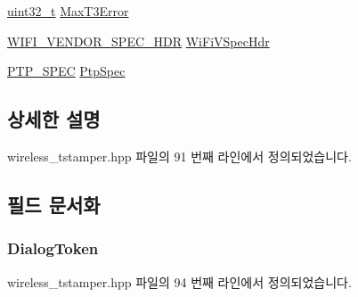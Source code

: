 \begin{DoxyCompactItemize}
\item 
\hyperlink{parse_8c_a6eb1e68cc391dd753bc8ce896dbb8315}{uint32\+\_\+t} \hyperlink{struct___t_i_m_i_n_g_m_s_m_t___e_v_e_n_t___d_a_t_a_aff7bc9f4cc3066fb2a16f752106f15a7}{Max\+T3\+Error}
\item 
\hyperlink{wireless__tstamper_8hpp_a207322d3b5d879b7bf0efd076fed62b0}{W\+I\+F\+I\+\_\+\+V\+E\+N\+D\+O\+R\+\_\+\+S\+P\+E\+C\+\_\+\+H\+DR} \hyperlink{struct___t_i_m_i_n_g_m_s_m_t___e_v_e_n_t___d_a_t_a_a833245209a0ea1388cc5eda2f9aacf4d}{Wi\+Fi\+V\+Spec\+Hdr}
\item 
\hyperlink{wireless__tstamper_8hpp_a4f0884fe8f53e92876fa1ea5cc4c72ce}{P\+T\+P\+\_\+\+S\+P\+EC} \hyperlink{struct___t_i_m_i_n_g_m_s_m_t___e_v_e_n_t___d_a_t_a_aac5b14c9395b4892cd4b00b447726287}{Ptp\+Spec}
\end{DoxyCompactItemize}


\subsection{상세한 설명}


wireless\+\_\+tstamper.\+hpp 파일의 91 번째 라인에서 정의되었습니다.



\subsection{필드 문서화}
\subsubsection[{\texorpdfstring{Dialog\+Token}{DialogToken}}]{ Dialog\+Token}\hypertarget{struct___t_i_m_i_n_g_m_s_m_t___e_v_e_n_t___d_a_t_a_a5fb015f69f95b9ee9e4f1598c4dc04f0}{}\label{struct___t_i_m_i_n_g_m_s_m_t___e_v_e_n_t___d_a_t_a_a5fb015f69f95b9ee9e4f1598c4dc04f0}


wireless\+\_\+tstamper.\+hpp 파일의 94 번째 라인에서 정의되었습니다.

